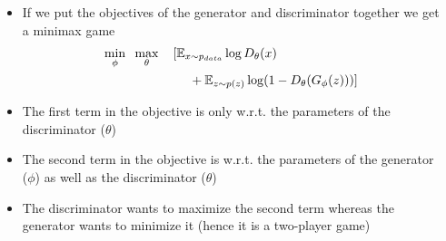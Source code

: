 \begin{frame}
	\begin{columns}
		\begin{overlayarea}{\textwidth}{\textheight}
			\vspace*{10mm}
			\begin{center}
						
			\end{center}		
		\end{overlayarea}

		\begin{overlayarea}{\textwidth}{\textheight}
			\begin{itemize}[<+->]
				\item<1-> If we put the objectives of the generator and discriminator together we get a minimax game
				\begin{align*}
				 \min\limits_{\phi}\hspace*{2mm} \max\limits_{\theta} \hspace*{4mm} [&\mathbb{E}_{x \sim p_{data}} \log D_{\theta}(x) \\
				 & ~~~+ \mathbb{E}_{z \sim p(z)} \log(1- D_{\theta}(G_{\phi}(z)) ) ] 
				\end{align*}
				\item<2-> The first term in the objective is only w.r.t. the parameters of the discriminator ($\theta$)

				\item<3-> The second term in the objective is w.r.t. the parameters of the generator ($\phi$) as well as the discriminator ($\theta$)
				\item<4-> The discriminator wants to maximize the second term whereas the generator wants to minimize it (hence it is a two-player game)
			\end{itemize}
		\end{overlayarea}
	\end{columns}
\end{frame}

